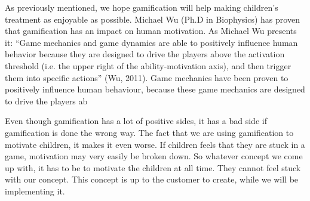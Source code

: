 As previously mentioned, we hope gamification will help making children's treatment as enjoyable as possible. Michael Wu (Ph.D in Biophysics) has proven that gamification has an impact on human motivation. 
As Michael Wu presents it:
``Game mechanics and game dynamics are able to positively influence human behavior because they are designed to drive the players above the
activation threshold (i.e. the upper right of the ability-motivation axis), 
and then trigger them into specific actions'' (Wu, 2011).  
Game mechanics have been proven to positively influence human behaviour, because these game mechanics are designed to drive the players ab


Even though gamification has a lot of positive sides, it has a bad side if gamification is done the wrong way.
The fact that we are using gamification to motivate children, it makes it even worse. If children feels that
they are stuck in a game, motivation may very easily be broken down. So whatever concept we come up with, it has to be 
to motivate the children at all time. They cannot feel stuck with our concept. This concept is up to the customer to create, 
while we will be implementing it.  





 
